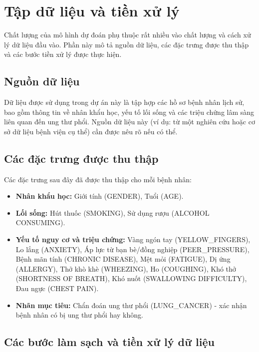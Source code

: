 \section{Tập dữ liệu và tiền xử lý}

Chất lượng của mô hình dự đoán phụ thuộc rất nhiều vào chất lượng và cách xử lý dữ liệu đầu vào. Phần này mô tả nguồn dữ liệu, các đặc trưng được thu thập và các bước tiền xử lý được thực hiện.

\subsection{Nguồn dữ liệu}

Dữ liệu được sử dụng trong dự án này là tập hợp các hồ sơ bệnh nhân lịch sử, bao gồm thông tin về nhân khẩu học, yếu tố lối sống và các triệu chứng lâm sàng liên quan đến ung thư phổi. Nguồn dữ liệu này (ví dụ: từ một nghiên cứu hoặc cơ sở dữ liệu bệnh viện cụ thể) cần được nêu rõ nếu có thể.

\subsection{Các đặc trưng được thu thập}

Các đặc trưng sau đây đã được thu thập cho mỗi bệnh nhân:
\begin{itemize}
    \item \textbf{Nhân khẩu học:} Giới tính (GENDER), Tuổi (AGE).
    \item \textbf{Lối sống:} Hút thuốc (SMOKING), Sử dụng rượu (ALCOHOL CONSUMING).
    \item \textbf{Yếu tố nguy cơ và triệu chứng:} Vàng ngón tay (YELLOW\_FINGERS), Lo lắng (ANXIETY), Áp lực từ bạn bè/đồng nghiệp (PEER\_PRESSURE), Bệnh mãn tính (CHRONIC DISEASE), Mệt mỏi (FATIGUE), Dị ứng (ALLERGY), Thở khò khè (WHEEZING), Ho (COUGHING), Khó thở (SHORTNESS OF BREATH), Khó nuốt (SWALLOWING DIFFICULTY), Đau ngực (CHEST PAIN).
    \item \textbf{Nhãn mục tiêu:} Chẩn đoán ung thư phổi (LUNG\_CANCER) - xác nhận bệnh nhân có bị ung thư phổi hay không.
\end{itemize}

\subsection{Các bước làm sạch và tiền xử lý dữ liệu}


